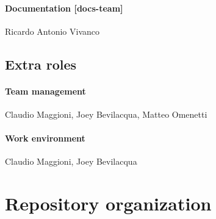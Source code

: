 \documentclass[hidelinks,12pt,a4paper,numbers=enddot]{scrartcl}
\begin{document}
\paragraph{Documentation {[}docs-team{]}}
Ricardo Antonio Vivanco

\subsection{Extra roles}

\paragraph{Team management}
Claudio Maggioni, Joey Bevilacqua, Matteo Omenetti

\paragraph{Work environment}
Claudio Maggioni, Joey Bevilacqua

\section{Repository organization}\label{repository-organization}
\end{document}
